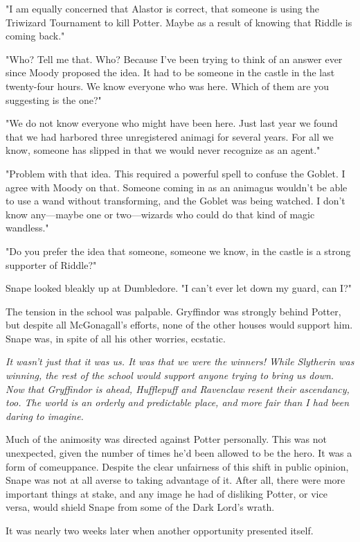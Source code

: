 "I am equally concerned that Alastor is correct, that someone is using the Triwizard Tournament to kill Potter. Maybe as a result of knowing that{\el} Riddle{\el} is coming back."

"Who? Tell me that. Who? Because I've been trying to think of an answer ever since Moody proposed the idea. It had to be someone in the castle in the last twenty-four hours. We know everyone who was here. Which of them are you suggesting is the one?"

"We do not know everyone who might have been here. Just last year we found that we had harbored three unregistered animagi for several years. For all we know, someone has slipped in that we would never recognize as an agent."

"Problem with that idea. This required a powerful spell to confuse the Goblet. I agree with Moody on that. Someone coming in as an animagus wouldn't be able to use a wand without transforming, and the Goblet was being watched. I don't know any—maybe one or two—wizards who could do that kind of magic wandless."

"Do you prefer the idea that someone, someone we know, in the castle is a strong supporter of Riddle?"

Snape looked bleakly up at Dumbledore. "I can't ever let down my guard, can I?"

The tension in the school was palpable. Gryffindor was strongly behind Potter, but despite all McGonagall's efforts, none of the other houses would support him. Snape was, in spite of all his other worries, ecstatic.

\emph{It wasn't just that it was us. It was that we were the winners! While Slytherin was winning, the rest of the school would support anyone trying to bring us down. Now that Gryffindor is ahead, Hufflepuff and Ravenclaw resent their ascendancy, too. The world is an orderly and predictable place, and more fair than I had been daring to imagine.}

Much of the animosity was directed against Potter personally. This was not unexpected, given the number of times he'd been allowed to be the hero. It was a form of comeuppance. Despite the clear unfairness of this shift in public opinion, Snape was not at all averse to taking advantage of it. After all, there were more important things at stake, and any image he had of disliking Potter, or vice versa, would shield Snape from some of the Dark Lord's wrath.

It was nearly two weeks later when another opportunity presented itself.

